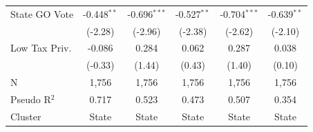 \begin{tabular*}{\textwidth}{@{\extracolsep{\fill}}lccccc}
   State GO Vote        & -0.448$^{**}$ & -0.696$^{***}$ & -0.527$^{**}$ & -0.704$^{***}$ & -0.639$^{**}$\\   
                        & (-2.28)      & (-2.96)       & (-2.38)      & (-2.62)       & (-2.10)\\   
   Low Tax Priv.        & -0.086        & 0.284          & 0.062         & 0.287          & 0.038\\   
                        & (-0.33)      & (1.44)        & (0.43)       & (1.40)        & (0.10)\\   
   \hline
   N         & 1,756         & 1,756          & 1,756         & 1,756          & 1,756\\  
   Pseudo R$^2$         & 0.717         & 0.523          & 0.473         & 0.507          & 0.354\\  
   Cluster              & State & State & State & State & State\\  
   \bottomrule
\end{tabular*}
\par\endgroup
